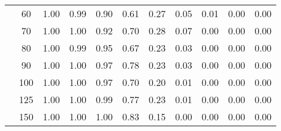 \begin{table}[t]
\begin{center}
\begin{subtable}[c]{\textwidth}
\begin{center}
\begin{tabular}{rcccccccccc}
                                        & \multicolumn{1}{c|}{60}  & \num{1.00}  & \num{0.99}  & \num{0.90}  & \num{0.61}  & \num{0.27}  & \num{0.05}  & \num{0.01}  & \num{0.00}  & \num{0.00}  \\
                                        & \multicolumn{1}{c|}{70}  & \num{1.00}  & \num{1.00}  & \num{0.92}  & \num{0.70}  & \num{0.28}  & \num{0.07}  & \num{0.00}  & \num{0.00}  & \num{0.00}  \\
                                        & \multicolumn{1}{c|}{80}  & \num{1.00}  & \num{0.99}  & \num{0.95}  & \num{0.67}  & \num{0.23}  & \num{0.03}  & \num{0.00}  & \num{0.00}  & \num{0.00}  \\
                                        & \multicolumn{1}{c|}{90}  & \num{1.00}  & \num{1.00}  & \num{0.97}  & \num{0.78}  & \num{0.23}  & \num{0.03}  & \num{0.00}  & \num{0.00}  & \num{0.00}  \\
                                        & \multicolumn{1}{c|}{100}  & \num{1.00}  & \num{1.00}  & \num{0.97}  & \num{0.70}  & \num{0.20}  & \num{0.01}  & \num{0.00}  & \num{0.00}  & \num{0.00}  \\
                                        & \multicolumn{1}{c|}{125}  & \num{1.00}  & \num{1.00}  & \num{0.99}  & \num{0.77}  & \num{0.23}  & \num{0.01}  & \num{0.00}  & \num{0.00}  & \num{0.00}  \\
                                        & \multicolumn{1}{c|}{150}  & \num{1.00}  & \num{1.00}  & \num{1.00}  & \num{0.83}  & \num{0.15}  & \num{0.00}  & \num{0.00}  & \num{0.00}  & \num{0.00}  \\
                                    \end{tabular}
            \end{center}
        \end{subtable}

        \vspace{5mm}


\end{center}
\end{table}
